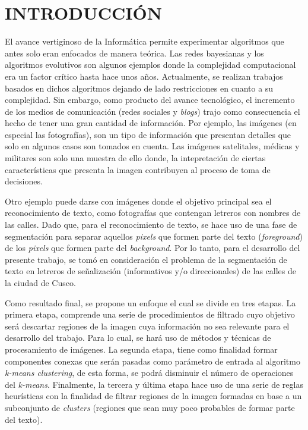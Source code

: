\chapter*{INTRODUCCIÓN}
\label{cap:introduccion}
%

El avance vertiginoso de la Informática permite experimentar algoritmos que 
antes solo eran enfocados de manera teórica. Las redes bayesianas y los 
algoritmos evolutivos son algunos ejemplos donde la complejidad computacional
era un factor crítico hasta hace unos años. Actualmente, se realizan trabajos 
basados en dichos algoritmos dejando de lado restricciones en cuanto a
su complejidad. Sin embargo, como producto del avance tecnológico, el 
incremento de los medios de comunicación (redes sociales y \textit{blogs}) trajo 
como consecuencia el hecho de tener una gran cantidad de información. Por 
ejemplo, las imágenes (en especial las fotografías), son un tipo de información 
que presentan detalles que solo en algunos casos son tomados en cuenta. Las 
imágenes satelitales, médicas y militares son solo una muestra de ello donde, 
la intepretación de ciertas características que presenta la imagen contribuyen 
al proceso de toma de decisiones.

Otro ejemplo puede darse con imágenes donde el objetivo principal sea el 
reconocimiento de texto, como fotografías que contengan letreros con nombres de 
las calles. Dado que, para el reconocimiento de texto, se hace uso de una fase
de segmentación para separar aquellos \textit{pixels} que formen parte del texto
(\textit{foreground}) de los \textit{pixels} que formen parte del 
\textit{background}. Por lo tanto, para el desarrollo del presente trabajo, se 
tomó en consideración el problema de la segmentación de texto en letreros de 
señalización (informativos y/o direccionales) de las calles de la ciudad de Cusco. 
 
Como resultado final, se propone un enfoque el cual se divide en tres etapas. La
primera etapa, comprende una serie de procedimientos de filtrado cuyo objetivo 
será descartar regiones de la imagen cuya información no sea relevante para el
desarrollo del trabajo. Para lo cual, se hará uso de métodos y técnicas de
procesamiento de imágenes. La segunda etapa, tiene como finalidad formar 
componentes conexas que serán pasadas como parámetro de entrada al algoritmo 
\textit{k-means clustering}, de esta forma, se podrá disminuir el número de 
operaciones del \textit{k-means}. Finalmente, la tercera y última etapa hace uso de una 
serie de reglas heurísticas con la finalidad de filtrar regiones de la imagen 
formadas en base a un subconjunto de \textit{clusters} (regiones que sean muy 
poco probables de formar parte del texto).

